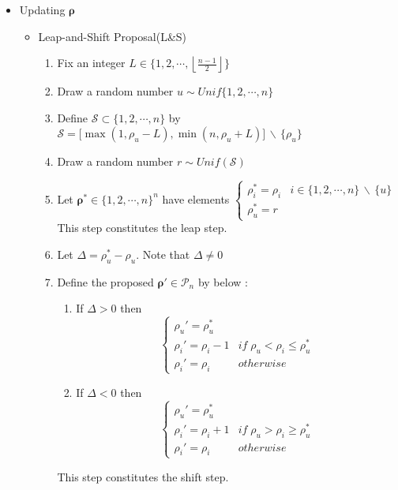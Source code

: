 \documentclass[12pt]{article}
\newcommand{\diff}{\,\backslash\,}
\newcommand{\floor}[1]{\left\lfloor #1 \right\rfloor}
\begin{document}
\begin{itemize}
\begin{enumerate}
    \end{enumerate}
    \item Updating $\boldsymbol{\rho}$ 
    \begin{itemize}
        \item Leap-and-Shift Proposal(L\&S)
        \begin{enumerate}
            \item Fix an integer $L\in \{1,2,\cdots, \floor{\frac{n-1}{2}}\}$
            \item Draw a random number $u\sim Unif\{1,2,\cdots, n\}$
            \item Define $\mathcal{S}\subset \{1,2,\cdots, n\}$ by $\mathcal{S}=\big[\max (1, \rho_u-L), \min (n, \rho_u+L)\big]\diff\{\rho_u\}$
            \item Draw a random number $r\sim Unif(\mathcal{S})$
            \item Let $\boldsymbol{\rho}^*\in \{1,2,\cdots, n\}^n$ have elements $\begin{cases}
            \rho_i^*=\rho_i & i\in \{1,2,\cdots,n\}\diff \{u\} \\\rho_u^*=r \end{cases}$\\ This step constitutes the leap step.
            \item Let $\Delta=\rho_u^*-\rho_u$. Note that $\Delta\neq 0$ 
            \item Define the proposed $\boldsymbol{\rho}'\in \mathcal{P}_n$ by below :
            \begin{enumerate}
                \item If $\Delta>0$ then $$\begin{cases}
                    \rho_u'=\rho_u^* \\ \rho_i'=\rho_i-1 & if \; \rho_u<\rho_i\leq \rho_u^* \\ \rho_i'=\rho_i & otherwise
                \end{cases} $$
                \item If $\Delta<0$ then $$\begin{cases}
                    \rho_u'=\rho_u^* \\ \rho_i'=\rho_i+1 & if \; \rho_u>\rho_i\geq \rho_u^* \\ \rho_i'=\rho_i & otherwise
                \end{cases} $$
            \end{enumerate} 
            This step constitutes the shift step.
        \end{enumerate}

\end{itemize}
\end{itemize}
\end{document}
